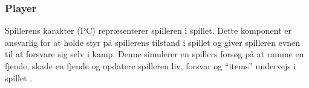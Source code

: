\subsubsection{Player}
Spillerens karakter (PC) repræsenterer spilleren i spillet. Dette komponent er ansvarlig for at
holde styr på spillerens tilstand i spillet og giver spilleren evnen til at forsvare
sig selv i kamp. Denne simulerer en spillers forsøg på at ramme en fjende, skade en 
fjende og opdatere spilleren liv, forsvar og ``items'' undervejs i spillet 
\parencite[Section 10.3.2][]{TekniskBilag}.


\newpage
